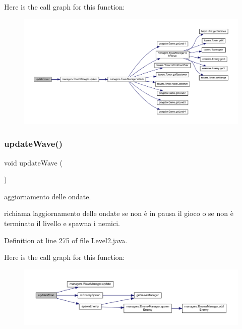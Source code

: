 Here is the call graph for this function\+:\nopagebreak
\begin{figure}[H]
\begin{center}
\leavevmode
\includegraphics[width=350pt]{classscenes_1_1_level2_ae4fd4a959e4d782a5e7ac0eff77ba27f_cgraph}
\end{center}
\end{figure}
\mbox{\label{classscenes_1_1_level2_ab424ab29e7ab4733f2efd1e6ef3f13b1}} 
\subsubsection{\texorpdfstring{update\+Wave()}{updateWave()}}
{\footnotesize\ttfamily void update\+Wave (\begin{DoxyParamCaption}{ }\end{DoxyParamCaption})}



aggiornamento delle ondate. 

richiama l\textquotesingle{}aggiornamento delle ondate se non è in pausa il gioco o se non è terminato il livello e spawna i nemici. 

Definition at line 275 of file Level2.\+java.

Here is the call graph for this function\+:\nopagebreak
\begin{figure}[H]
\begin{center}
\leavevmode
\includegraphics[width=350pt]{classscenes_1_1_level2_ab424ab29e7ab4733f2efd1e6ef3f13b1_cgraph}
\end{center}
\end{figure}


